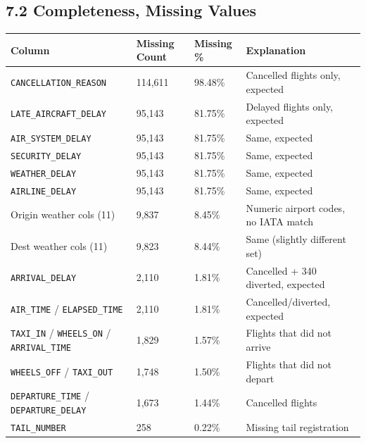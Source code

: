 \documentclass{article}
\newcommand{\code}[1]{\texttt{\small #1}}
\begin{document}
\subsection*{\textcolor{accentgold}{7.2 Completeness, Missing Values}}

\begin{tcolorbox}[mainbox, title={Missing Value Analysis}]
\renewcommand{\arraystretch}{1.3}
\begin{tabularx}{\textwidth}{X C{2.2cm} C{1.8cm} L{3.5cm}}
    \toprule
    \textbf{Column} & \textbf{Missing Count} & \textbf{Missing \%} & \textbf{Explanation} \\
    \midrule
    \code{CANCELLATION\_REASON}                              & 114,611 & 98.48\% & Cancelled flights only, expected \\
    \code{LATE\_AIRCRAFT\_DELAY}                             &  95,143 & 81.75\% & Delayed flights only, expected \\
    \code{AIR\_SYSTEM\_DELAY}                                &  95,143 & 81.75\% & Same, expected \\
    \code{SECURITY\_DELAY}                                   &  95,143 & 81.75\% & Same, expected \\
    \code{WEATHER\_DELAY}                                    &  95,143 & 81.75\% & Same, expected \\
    \code{AIRLINE\_DELAY}                                    &  95,143 & 81.75\% & Same, expected \\
    Origin weather cols (11)                                  &   9,837 &  8.45\% & Numeric airport codes, no IATA match \\
    Dest weather cols (11)                                    &   9,823 &  8.44\% & Same (slightly different set) \\
    \code{ARRIVAL\_DELAY}                                    &   2,110 &  1.81\% & Cancelled + 340 diverted, expected \\
    \code{AIR\_TIME} / \code{ELAPSED\_TIME}                  &   2,110 &  1.81\% & Cancelled/diverted, expected \\
    \code{TAXI\_IN} / \code{WHEELS\_ON} / \code{ARRIVAL\_TIME} & 1,829 &  1.57\% & Flights that did not arrive \\
    \code{WHEELS\_OFF} / \code{TAXI\_OUT}                    &   1,748 &  1.50\% & Flights that did not depart \\
    \code{DEPARTURE\_TIME} / \code{DEPARTURE\_DELAY}         &   1,673 &  1.44\% & Cancelled flights \\
    \code{TAIL\_NUMBER}                                      &     258 &  0.22\% & Missing tail registration \\
    \bottomrule
\end{tabularx}
\end{tcolorbox}
\end{document}
